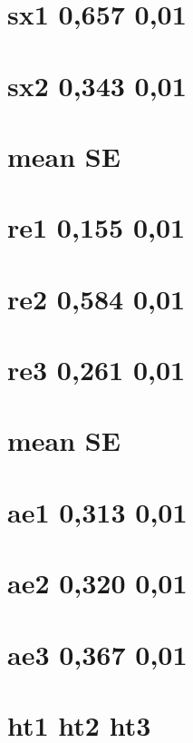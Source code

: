 \documentclass[]{book}
\theoremstyle{definition}
\theoremstyle{definition}
\theoremstyle{definition}
\theoremstyle{remark}
\begin{document}
\section{sx1 0,657 0,01}\label{sx1-0657-001}

\section{sx2 0,343 0,01}\label{sx2-0343-001}

\section{mean SE}\label{mean-se-1}

\section{re1 0,155 0,01}\label{re1-0155-001}

\section{re2 0,584 0,01}\label{re2-0584-001}

\section{re3 0,261 0,01}\label{re3-0261-001}

\section{mean SE}\label{mean-se-2}

\section{ae1 0,313 0,01}\label{ae1-0313-001}

\section{ae2 0,320 0,01}\label{ae2-0320-001}

\section{ae3 0,367 0,01}\label{ae3-0367-001}

\section{ht1 ht2 ht3}\label{ht1-ht2-ht3}
\end{document}
